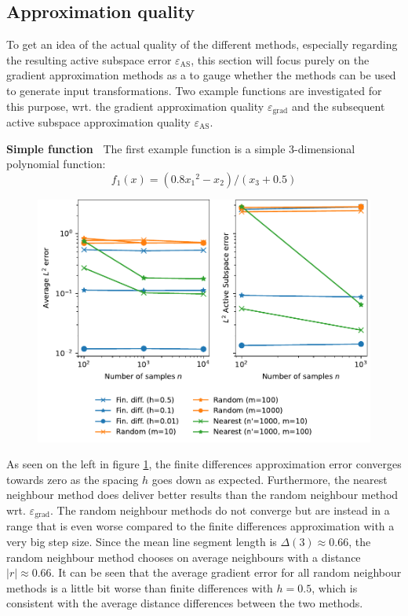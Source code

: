 \documentclass[
  a4paper,  %
  twoside,  %
  bibliography=totoc,
  headsepline,
  cleardoublepage=empty,
  parskip=half,
  draft=false
]{scrbook}
\begin{document}
\subsection{Approximation quality}

To get an idea of the actual quality of the different methods, especially regarding the resulting active subspace error $\varepsilon_{\text{AS}}$, this section will focus purely on the gradient approximation methods as a to gauge whether the methods can be used to generate input transformations.
Two example functions are investigated for this purpose, wrt. the gradient approximation quality $\varepsilon_{\text{grad}}$ and the subsequent active subspace approximation quality $\varepsilon_{\text{AS}}$.

\vspace{2mm}
\textbf{Simple function~}
The first example function is a simple $3$-dimensional polynomial function:
\begin{equation}
f_1(x)=(0.8 {x_1}^2 - x_2) / (x_3 + 0.5)
\nonumber
\end{equation}



\begin{figure}[H]
\centering
	\includegraphics[width=\textwidth]{graphics/as_errors_f1}
	\label{fig:as_errors_f1}
\end{figure}

As seen on the left in figure \cref{fig:as_errors_f1}, the finite differences approximation error converges towards zero as the spacing $h$ goes down as expected.
Furthermore, the nearest neighbour method does deliver better results than the random neighbour method wrt. $\varepsilon_{\text{grad}}$.
The random neighbour methods do not converge but are instead in a range that is even worse compared to the finite differences approximation with a very big step size.
Since the mean line segment length is $\Delta(3) \approx 0.66$, the random neighbour method chooses on average neighbours with a distance $|r| \approx 0.66$.
It can be seen that the average gradient error for all random neighbour methods is a little bit worse than finite differences with $h=0.5$, which is consistent with the average distance differences between the two methods.
\end{document}

